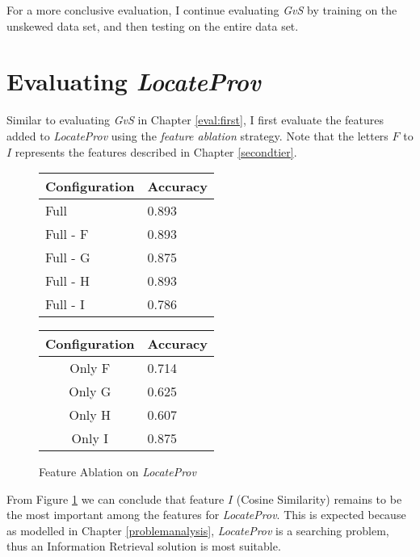 For a more conclusive evaluation, I continue evaluating {\it GvS} by training on the unskewed data set, and then testing on the entire data set.

\section{Evaluating {\it LocateProv}}
\label{eval:second}
Similar to evaluating {\it GvS} in Chapter \ref{eval:first}, I first evaluate the features added to {\it LocateProv} using the {\it feature ablation} strategy. Note that the letters $F$ to $I$ represents the features described in Chapter \ref{secondtier}.

\begin{figure}[ht]
\begin{minipage}[b]{0.45\linewidth}\centering
\begin{tabular}{ l | l }
Configuration & Accuracy \\
\hline
Full		& 0.893 \\
Full - F	& 0.893 \\
Full - G	& 0.875 \\
Full - H	& 0.893 \\
Full - I	& 0.786 \\
\end{tabular}
\end{minipage}
\hspace{0.5cm}
\begin{minipage}[b]{0.45\linewidth}\centering
\begin{tabular}{ c | l }
Configuration & Accuracy \\
\hline
Only F	& 0.714 \\
Only G	& 0.625 \\
Only H	& 0.607 \\
Only I	& 0.875 \\
\end{tabular}
\end{minipage}
\caption{Feature Ablation on {\it LocateProv}}
\label{fig:ablation_second}
\end{figure}
From Figure \ref{fig:ablation_second} we can conclude that feature $I$ (Cosine Similarity) remains to be the most important among the features for {\it LocateProv}. This is expected because as modelled in Chapter \ref{problemanalysis}, {\it LocateProv} is a searching problem, thus an Information Retrieval solution is most suitable.

